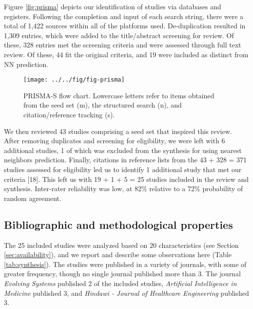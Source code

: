 \documentclass[preprint, 3p,
authoryear]{elsarticle} %
\begin{document}
Figure \ref{fig:prisma} depicts our identification of studies via
databases and registers. Following the completion and input of each
search string, there were a total of 1,422 sources within all of the
platforms used. De-duplication resulted in 1,309 entries, which were
added to the title/abstract screening for review. Of these, 328 entries
met the screening criteria and were assessed through full text review.
Of these, 44 fit the original criteria, and 19 were included as distinct
from NN prediction.

\begin{figure}

{\centering \texttt{[image: ../../fig/fig-prisma]} 

}

\caption{\label{fig:prisma}PRISMA-S flow chart. Lowercase letters refer to items obtained from the seed set (m), the structured search (n), and citation/reference tracking (s).}\label{fig:fig:prisma}
\end{figure}

We then reviewed 43 studies comprising a seed set that inspired this
review. After removing duplicates and screening for eligibility, we were
left with 6 additional studies, 1 of which was excluded from the
synthesis for using nearest neighbors prediction. Finally, citations in
reference lists from the 43 + 328 = 371 studies assessed for eligibility
led us to identify 1 additional study that met our criteria {[}18{]}.
This left us with 19 + 1 + 5 = 25 studies included in the review and
synthesis. Inter-rater reliability was low, at 82\% relative to a 72\%
probability of random agreement.

\hypertarget{bibliographic-and-methodological-properties}{%
\subsection{Bibliographic and methodological
properties}\label{bibliographic-and-methodological-properties}}

The 25 included studies were analyzed based on 20 characteristics (see
Section \ref{sec:availability}), and we report and describe some
observations here (Table \ref{tab:synthesis}). The studies were
published in a variety of journals, with some of greater frequency,
though no single journal published more than 3. The journal
\emph{Evolving Systems} published 2 of the included studies,
\emph{Artificial Intelligence in Medicine} published 3, and
\emph{Hindawi - Journal of Healthcare Engineering} published 3.
\end{document}
